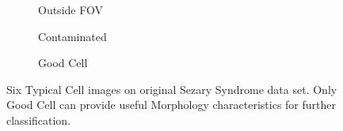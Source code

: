 \begin{figure}[ht]
\begin{center}
\begin{subfigure}[b]{0.33\textwidth}
			\caption{Outside FOV}
			\label{fig:Outside FOV}
		\end{subfigure}
		\begin{subfigure}[b]{0.33\textwidth}
			\caption{Contaminated}
			\label{fig:Contaminated}
		\end{subfigure}
		\begin{subfigure}[b]{0.33\textwidth}
			\caption{Good Cell}
			\label{fig:Good Cell}
		\end{subfigure}
	\end{center}
	\caption{Six Typical Cell images on original Sezary Syndrome data set. Only Good Cell can provide useful Morphology characteristics for further classification.}
	\label{fig:lennas}
\end{figure}

